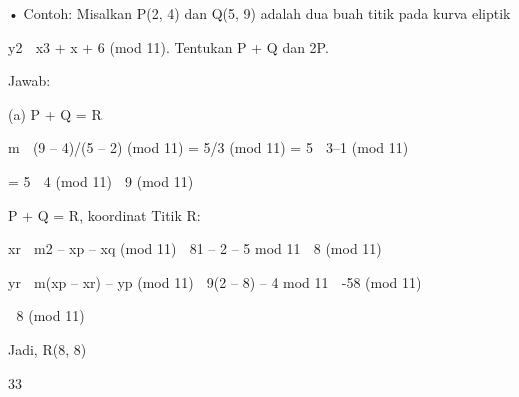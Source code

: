 \documentclass{article}
\begin{document}

• Contoh: Misalkan P(2, 4) dan Q(5, 9) adalah dua buah titik pada kurva eliptik 

y2  x3 + x + 6  (mod 11). Tentukan P  + Q dan 2P.


 Jawab: 

    (a) P + Q = R

  m   (9 – 4)/(5 – 2) (mod 11) =  5/3  (mod 11) = 5  3–1 (mod 11)



                      = 5  4 (mod 11)  9 (mod 11) 

 P + Q = R, koordinat Titik R: 

     xr  m2 – xp – xq (mod 11)  81 – 2 – 5 mod 11  8 (mod 11)

     yr  m(xp – xr) – yp (mod 11)  9(2 – 8) – 4 mod 11  -58 (mod 11) 







                 8 (mod 11)

 Jadi,  R(8, 8) 

33
\end{document}
